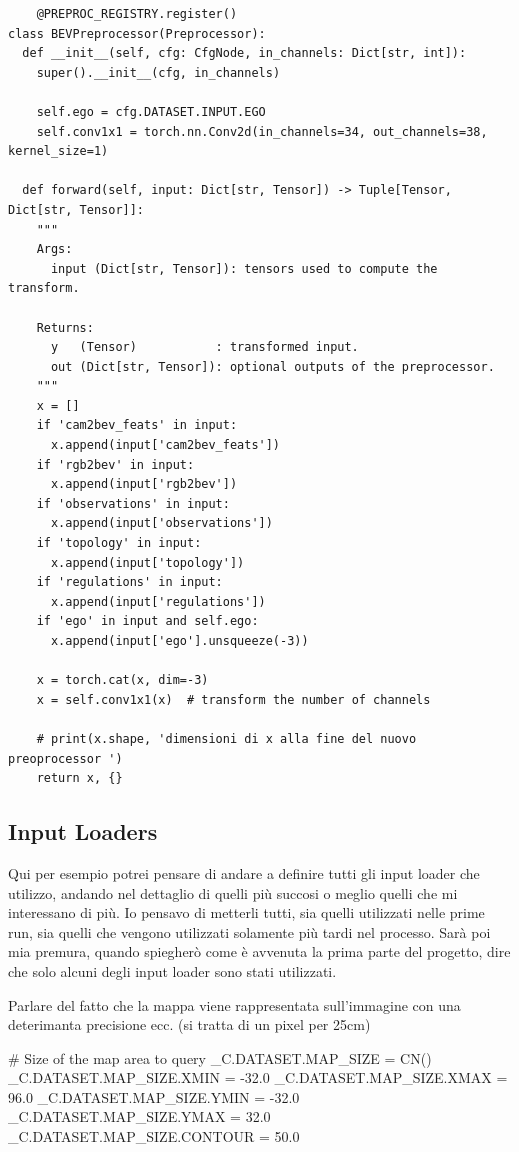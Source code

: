 \begin{verbatim}
    @PREPROC_REGISTRY.register()
class BEVPreprocessor(Preprocessor):
  def __init__(self, cfg: CfgNode, in_channels: Dict[str, int]):
    super().__init__(cfg, in_channels)

    self.ego = cfg.DATASET.INPUT.EGO
    self.conv1x1 = torch.nn.Conv2d(in_channels=34, out_channels=38, kernel_size=1)

  def forward(self, input: Dict[str, Tensor]) -> Tuple[Tensor, Dict[str, Tensor]]:
    """
    Args:
      input (Dict[str, Tensor]): tensors used to compute the transform.

    Returns:
      y   (Tensor)           : transformed input.
      out (Dict[str, Tensor]): optional outputs of the preprocessor.
    """
    x = []
    if 'cam2bev_feats' in input:
      x.append(input['cam2bev_feats'])
    if 'rgb2bev' in input:
      x.append(input['rgb2bev'])
    if 'observations' in input:
      x.append(input['observations'])
    if 'topology' in input:
      x.append(input['topology'])
    if 'regulations' in input:
      x.append(input['regulations'])
    if 'ego' in input and self.ego:
      x.append(input['ego'].unsqueeze(-3))
      
    x = torch.cat(x, dim=-3)
    x = self.conv1x1(x)  # transform the number of channels
    
    # print(x.shape, 'dimensioni di x alla fine del nuovo preoprocessor ')
    return x, {}
\end{verbatim}

\subsection{Input Loaders}
Qui per esempio potrei pensare di andare a definire tutti gli input loader che utilizzo, andando nel dettaglio di quelli più succosi o meglio quelli che mi interessano di più. 
Io pensavo di metterli tutti, sia quelli utilizzati nelle prime run, sia quelli che vengono utilizzati solamente più tardi nel processo. Sarà poi mia premura, quando spiegherò come è avvenuta la prima parte del progetto, dire che solo alcuni degli input loader sono stati utilizzati.

Parlare del fatto che la mappa viene rappresentata sull'immagine con una deterimanta precisione ecc. (si tratta di un pixel per 25cm)

# Size of the map area to query
_C.DATASET.MAP_SIZE = CN()
_C.DATASET.MAP_SIZE.XMIN = -32.0
_C.DATASET.MAP_SIZE.XMAX =  96.0
_C.DATASET.MAP_SIZE.YMIN = -32.0
_C.DATASET.MAP_SIZE.YMAX =  32.0
_C.DATASET.MAP_SIZE.CONTOUR = 50.0

